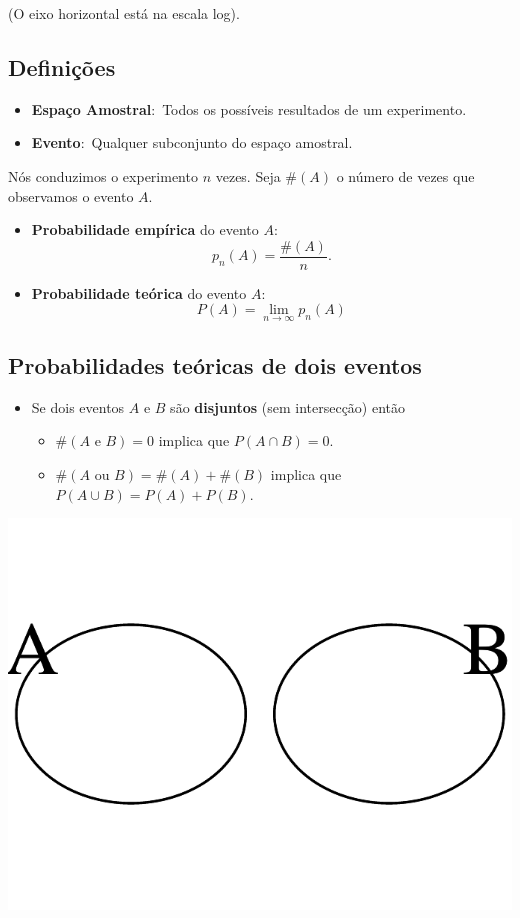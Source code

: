 \documentclass[]{article}
\providecommand{\tightlist}{%
  \setlength{\itemsep}{0pt}\setlength{\parskip}{0pt}}
\begin{document}
(O eixo horizontal está na escala log).

\subsection{Definições}\label{definicoes}

\begin{itemize}
\tightlist
\item
  \textbf{Espaço Amostral}:~Todos os possíveis resultados de um
  experimento.
\item
  \textbf{Evento}:~Qualquer subconjunto do espaço amostral.
\end{itemize}

Nós conduzimos o experimento \(n\) vezes. Seja \(\#(A)\) o número de
vezes que observamos o evento \(A\).

\begin{itemize}
\tightlist
\item
  \textbf{Probabilidade empírica} do evento \(A\): \[
    p_n(A)=\frac{\#(A)}{n}.
    \]
\item
  \textbf{Probabilidade teórica} do evento \(A\): \[
    P(A)=\lim_{n\to\infty}p_n(A)
    \] 
\end{itemize}

\subsection{Probabilidades teóricas de dois
eventos}\label{probabilidades-teoricas-de-dois-eventos}

\begin{itemize}
\tightlist
\item
  Se dois eventos \(A\) e \(B\) são \textbf{disjuntos} (sem intersecção)
  então

  \begin{itemize}
  \tightlist
  \item
    \(\#(A \text{ e } B) = 0\) implica que \(P(A \cap B)=0.\)
  \item
    \(\#(A \text{ ou } B)=\#(A)+\#(B)\) implica que
    \(P(A \cup B)=P(A)+P(B).\)
  \end{itemize}
\end{itemize}

\includegraphics{probability_files/figure-latex/unnamed-chunk-8-1.pdf}
\end{document}
